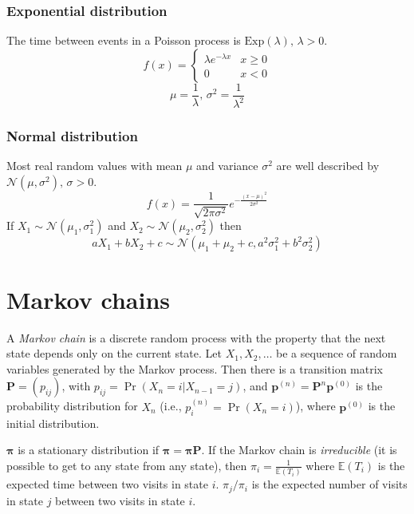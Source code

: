 \subsubsection{Exponential distribution}
The time between events in a Poisson process is $\textrm{Exp}(\lambda),\,\lambda>0$.
\[
    f(x) = \left\{
        \begin{array}{cl}
            \lambda e^{-\lambda x} & x\geq0\\
            0 & x<0
        \end{array}\right.
\]
\[
    \mu=\frac{1}{\lambda},\,\sigma^2=\frac{1}{\lambda^2}
\]

\subsubsection{Normal distribution}
Most real random values with mean $\mu$ and variance $\sigma^2$ are well described by $\mathcal{N}(\mu,\sigma^2),\,\sigma>0$.
\[ 
    f(x) = \frac{1}{\sqrt{2\pi\sigma^2}}e^{-\frac{(x-\mu)^2}{2\sigma^2}} 
\]
If $X_1 \sim \mathcal{N}(\mu_1,\sigma_1^2)$ and $X_2 \sim \mathcal{N}(\mu_2,\sigma_2^2)$ then
\[ 
aX_1 + bX_2 + c \sim \mathcal{N}(\mu_1+\mu_2+c,a^2\sigma_1^2+b^2\sigma_2^2) 
\]

\section{Markov chains}
A \emph{Markov chain} is a discrete random process with the property that the next state depends only on the current state.
Let $X_1,X_2,\ldots$ be a sequence of random variables generated by the Markov process.
Then there is a transition matrix $\mathbf{P} = (p_{ij})$, with $p_{ij} = \Pr(X_n = i | X_{n-1} = j)$,
and $\mathbf{p}^{(n)} = \mathbf P^n \mathbf p^{(0)}$ is the probability distribution for $X_n$ (i.e., $p^{(n)}_i = \Pr(X_n = i)$),
where $\mathbf{p}^{(0)}$ is the initial distribution.

$\mathbf{\pi}$ is a stationary distribution if $\mathbf{\pi} = \mathbf{\pi P}$.
If the Markov chain is \emph{irreducible} (it is possible to get to any state from any state),
then $\pi_i = \frac{1}{\mathbb{E}(T_i)}$ where $\mathbb{E}(T_i)$  is the expected time between two visits in state $i$.
$\pi_j/\pi_i$ is the expected number of visits in state $j$ between two visits in state $i$.

